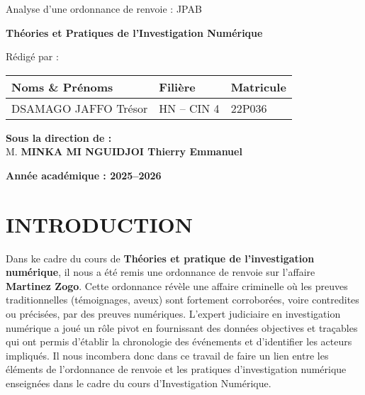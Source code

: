 \documentclass[12pt, a4paper]{article}
\begin{document}
\begin{titlepage}
	\noindent

	\vspace{1cm}

	{\Large Analyse d'une ordonnance de renvoie : JPAB}

	\vspace{0.5cm}

	{\LARGE \textbf{Théories et Pratiques de l'Investigation Numérique}}

	\vspace{2cm}

	{\large Rédigé par :}

	\vspace{0.5cm}

	\begin{tabular}{|>{\centering\arraybackslash}m{8cm}
		|>{\centering\arraybackslash}m{4cm}
		|>{\centering\arraybackslash}m{3cm}|}
		\hline
		\textbf{Noms \& Prénoms} & \textbf{Filière} & \textbf{Matricule} \\
		\hline
		DSAMAGO JAFFO Trésor     & HN -- CIN 4      & 22P036             \\
		\hline
	\end{tabular}

	\vfill

	\begin{Large}
		\textbf{Sous la direction de :} \\
		M. \textbf{MINKA MI NGUIDJOI Thierry Emmanuel} \\
	\end{Large}

	\vspace{1cm}

	\textbf{Année académique : 2025--2026}
\end{titlepage}

\section*{INTRODUCTION}
Dans ke cadre du cours de \textbf{Théories et pratique de l'investigation numérique}, il nous a été remis une ordonnance de renvoie sur l'affaire \textbf{Martinez Zogo}. Cette ordonnance révèle une affaire criminelle où les preuves traditionnelles (témoignages, aveux) sont fortement corroborées, voire contredites ou précisées, par des preuves numériques. L'expert judiciaire en investigation numérique a joué un rôle pivot en fournissant des données objectives et traçables qui ont permis d'établir la chronologie des événements et d'identifier les acteurs impliqués.
Il nous incombera donc dans ce travail de faire un lien entre les éléments de l'ordonnance de renvoie et les pratiques d'investigation numérique enseignées dans le cadre du cours d'Investigation Numérique.
\newpage
\end{document}
